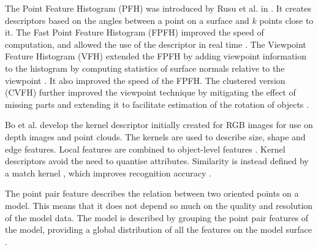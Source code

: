 \documentclass[11pt,a4paper]{kth-mag}
\begin{document}
The Point Feature Histogram (PFH) was introduced by Rusu et al. in
\cite{rusu2008persistent}. It creates descriptors based on the angles between a
point on a surface and $k$ points close to it. The Fast Point Feature Histogram
(FPFH) improved the speed of computation, and allowed the use of the descriptor
in real time \cite{rusu2009fast}. The Viewpoint Feature Histogram (VFH) extended
the FPFH by adding viewpoint information to the histogram by computing
statistics of surface normals relative to the viewpoint \cite{rusu2010fast}. It
also improved the speed of the FPFH. The clustered version (CVFH) further
improved the viewpoint technique by mitigating the effect of missing parts and
extending it to facilitate estimation of the rotation of objects \cite{aldoma2011cad}.

Bo et al. develop the kernel descriptor initially created for RGB images for use
on depth images and point clouds. The kernels are used to describe size, shape
and edge features. Local features are combined to object-level features . Kernel
descriptors avoid the need to quantise attributes. Similarity is instead defined
by a match kernel \cite{bo2010kernel}, which improves recognition accuracy
\cite{bo2011depth}.

The point pair feature describes the relation between two oriented points on a
model. This means that it does not depend so much on the quality and resolution
of the model data. The model is described by grouping the point pair features of
the model, providing a global distribution of all the features on the model
surface \cite{drost2010model}.
\end{document}
